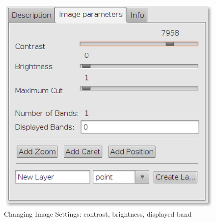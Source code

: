 \documentclass[12pt,a4paper,final]{report}
\begin{document}
\begin{figure}[H]
 \centering
 \includegraphics[scale=0.45,keepaspectratio=true]{./images/ImageProperties3.png}
 \caption{Changing Image Settings: contrast, brightness, displayed band}
\end{figure}
\end{document}
